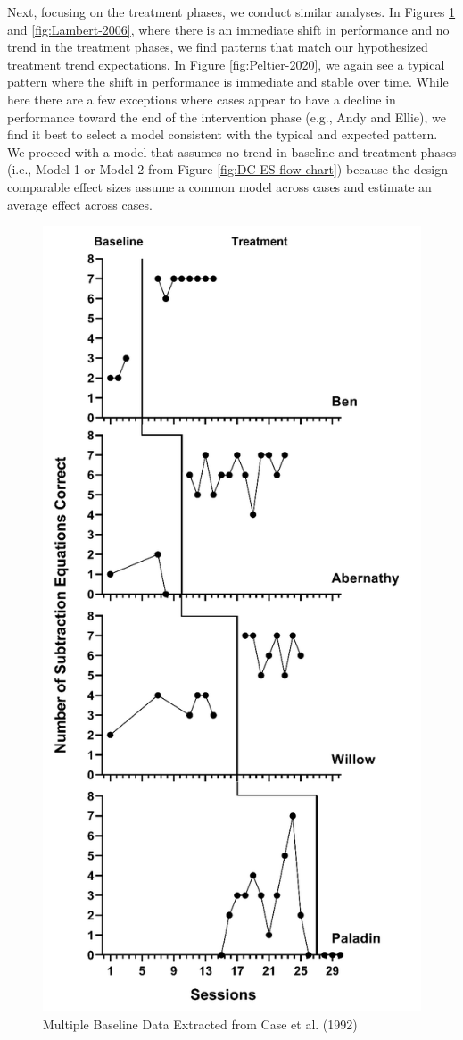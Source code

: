 \documentclass[
]{book}
\begin{document}
Next, focusing on the treatment phases, we conduct similar analyses. In Figures \ref{fig:Case-1992} and \ref{fig:Lambert-2006}, where there is an immediate shift in performance and no trend in the treatment phases, we find patterns that match our hypothesized treatment trend expectations. In Figure \ref{fig:Peltier-2020}, we again see a typical pattern where the shift in performance is immediate and stable over time. While here there are a few exceptions where cases appear to have a decline in performance toward the end of the intervention phase (e.g., Andy and Ellie), we find it best to select a model consistent with the typical and expected pattern. We proceed with a model that assumes no trend in baseline and treatment phases (i.e., Model 1 or Model 2 from Figure \ref{fig:DC-ES-flow-chart}) because the design-comparable effect sizes assume a common model across cases and estimate an average effect across cases.

\begin{figure}
\includegraphics[width=0.5\linewidth]{images/Case1992} \caption{Multiple Baseline Data Extracted from Case et al. (1992)}\label{fig:Case-1992}
\end{figure}
\end{document}
